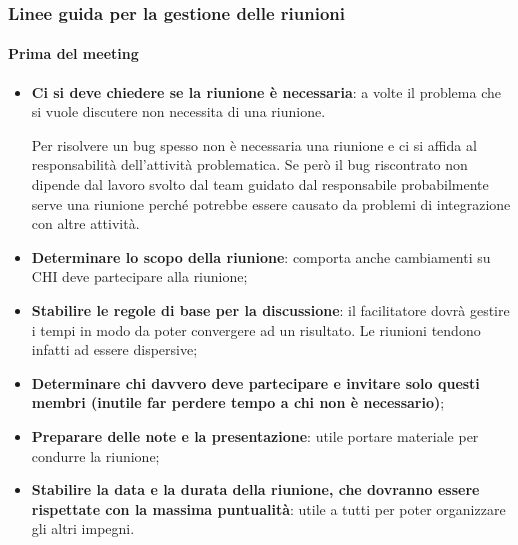 \subsubsection{Linee guida per la gestione delle riunioni}
\paragraph{Prima del meeting}
\begin{itemize}
	\item \textbf{Ci si deve chiedere se la riunione è necessaria}: a volte il problema che si vuole discutere non necessita di una riunione.
	\begin{info}[Esempio]
		Per risolvere un bug spesso non è necessaria una riunione e ci si affida al responsabilità dell'attività problematica. Se però il bug riscontrato non dipende dal lavoro svolto dal team guidato dal responsabile probabilmente serve una riunione perché potrebbe essere causato da problemi di integrazione con altre attività.
	\end{info}
	\item \textbf{Determinare lo scopo della riunione}: comporta anche cambiamenti su CHI deve partecipare alla riunione;
	\item \textbf{Stabilire le regole di base per la discussione}: il facilitatore dovrà gestire i tempi in modo da poter convergere ad un risultato. Le riunioni tendono infatti ad essere dispersive;
	\item \textbf{Determinare chi davvero deve partecipare e invitare solo questi membri (inutile far perdere tempo a chi non è necessario)};
	\item \textbf{Preparare delle note e la presentazione}: utile portare materiale per condurre la riunione;
	\item \textbf{Stabilire la data e la durata della riunione, che dovranno essere rispettate con la massima puntualità}: utile a tutti per poter organizzare gli altri impegni.
\end{itemize}

